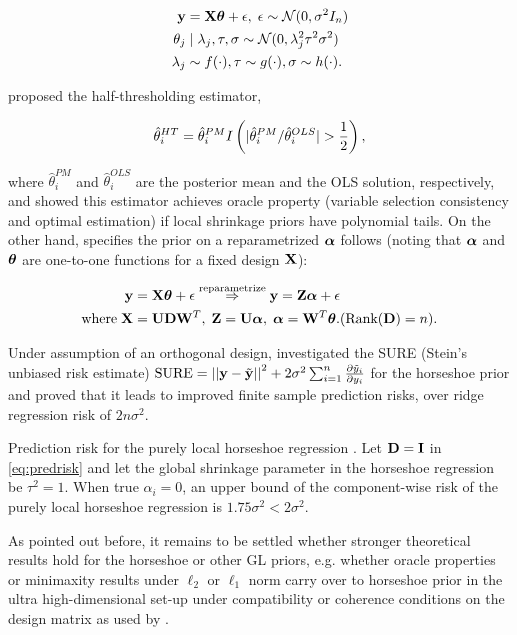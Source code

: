 \documentclass[sts,preprint]{imsart}
\begin{document}
\begin{align*}
{\bf y} & = {\bf X} \boldsymbol{\theta} + \epsilon, \; \epsilon \sim {\cal N}(0, \sigma^2 I_n) \\
\theta_j & \mid \lambda_j, \tau, \sigma \sim {\cal N}(0, \lambda_j^2 \tau^2 \sigma^2) \\
\lambda_j & \sim f(\cdot), \tau \sim g(\cdot), \sigma \sim h(\cdot). 
\end{align*}

\citet{tang2016bayesian} proposed the half-thresholding estimator,

\[
\hat{\theta}_i^{HT} = \hat{\theta}_i^{PM} I \left(\lvert \hat{\theta}_i^{PM}/\hat{\theta}_i^{OLS}\rvert > \frac{1}{2} \right),
\]

where $\hat{\theta}_i^{PM}$ and $\hat{\theta}_i^{OLS}$ are the posterior mean and the OLS solution, respectively, and showed this estimator achieves oracle property (variable selection consistency and optimal estimation) if local shrinkage priors have polynomial tails. On the other hand, \citet{bhadra2016prediction} specifies the prior on a reparametrized $\boldsymbol{\alpha}$ follows (noting that $\boldsymbol{\alpha}$ and $\boldsymbol{\theta}$ are one-to-one functions for a fixed design ${\bf X}$):

\begin{align}
{\bf y} & = {\bf X} \boldsymbol{\theta} + \epsilon \stackrel{\text{reparametrize}}{\Rightarrow} {\bf y} = {\bf Z} \boldsymbol{\alpha} + \epsilon \nonumber \\
\text{where} \; {\bf X} & = {\bf U} {\bf D} {\bf W}^T, \; {\bf Z} = {\bf U} \boldsymbol{\alpha}, \; \boldsymbol{\alpha} = {\bf W}^T \boldsymbol{\theta}. (\text{Rank}({\bf D}) = n). \label{eq:predrisk}
\end{align}

Under assumption of an orthogonal design, \citet{bhadra2016prediction} investigated the SURE (Stein's unbiased risk estimate) $\text{SURE} = \left|\left|{\bf y} - \tilde{{\bf y}}\right|\right|^2 + 2 \sigma^2 \sum_{i=1}^{n} \frac{\partial \tilde{y}_i}{\partial y_i}$ for the horseshoe prior and proved that it leads to improved finite sample prediction risks, over ridge regression risk of $2n \sigma^2$. 

\begin{theorem}
Prediction risk for the purely local horseshoe regression \citep{bhadra2016prediction}. Let ${\bf D} = {\bf I}$ in \eqref{eq:predrisk} and let the global shrinkage parameter in the horseshoe regression be $\tau^2 = 1$. When true $\alpha_i = 0$, an upper bound of the component-wise risk of the purely local horseshoe regression is $1.75\sigma^2 < 2\sigma^2$. 
\end{theorem}

As pointed out before, it remains to be settled whether stronger theoretical results hold for the horseshoe or other GL priors, e.g. whether oracle properties or minimaxity results under $\ell_2$ or $\ell_1$ norm carry over to horseshoe prior in the ultra high-dimensional set-up under compatibility or coherence conditions on the design matrix as used by \citet{buhlmann2011statistics, castillo2015bayesian}. 
\end{document}
